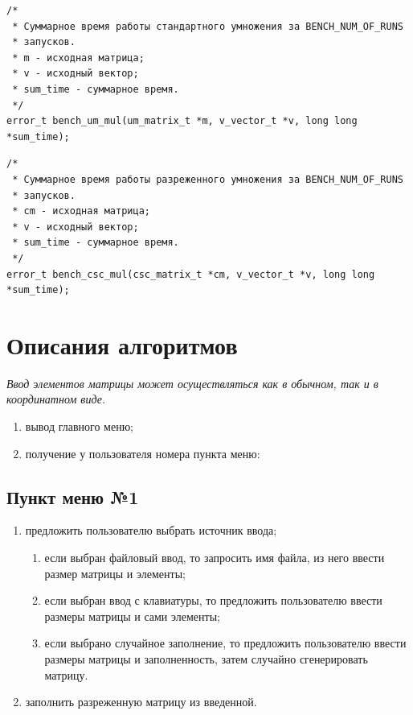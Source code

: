 \documentclass[a4paper,12pt]{extarticle}
\begin{document}
 \vspace{0.5cm}

\begin{verbatim}
/*
 * Суммарное время работы стандартного умножения за BENCH_NUM_OF_RUNS
 * запусков.
 * m - исходная матрица;
 * v - исходный вектор;
 * sum_time - суммарное время.
 */
error_t bench_um_mul(um_matrix_t *m, v_vector_t *v, long long *sum_time);
\end{verbatim}


 \vspace{0.5cm}

\begin{verbatim}
/*
 * Суммарное время работы разреженного умножения за BENCH_NUM_OF_RUNS
 * запусков.
 * сm - исходная матрица;
 * v - исходный вектор;
 * sum_time - суммарное время.
 */
error_t bench_csc_mul(csc_matrix_t *cm, v_vector_t *v, long long *sum_time);
\end{verbatim}


 \vspace{0.5cm}


\newpage
\section{Описания алгоритмов}
\textit{Ввод элементов матрицы может осуществляться как в обычном, так и в координатном виде.}

\begin{enumerate}
    \item вывод главного меню;
    \item получение у пользователя номера пункта меню:
\end{enumerate}

\subsection{Пункт меню №1}
\begin{enumerate}
    \item предложить пользователю выбрать источник ввода;
    \begin{enumerate}
        \item если выбран файловый ввод, то запросить имя файла, из него ввести размер матрицы и элементы;
        \item если выбран ввод с клавиатуры, то предложить пользователю ввести размеры матрицы и сами элементы;
        \item если выбрано случайное заполнение, то предложить пользователю ввести размеры матрицы и заполненность, затем случайно сгенерировать матрицу.
    \end{enumerate}
    \item заполнить разреженную матрицу из введенной.
\end{enumerate}
\end{document}
